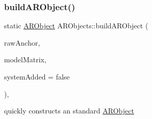 \subsubsection{\texorpdfstring{build\+A\+R\+Object()}{buildARObject()}}
{\footnotesize\ttfamily static \mbox{\hyperlink{struct_a_r_objects_1_1_a_r_object}{A\+R\+Object}} A\+R\+Objects\+::build\+A\+R\+Object (\begin{DoxyParamCaption}\item[{A\+R\+Anchor $\ast$}]{raw\+Anchor,  }\item[{of\+Matrix4x4}]{model\+Matrix,  }\item[{bool}]{system\+Added = {\ttfamily false} }\end{DoxyParamCaption})\hspace{0.3cm}{\ttfamily [inline]}, {\ttfamily [static]}}



quickly constructs an standard \mbox{\hyperlink{struct_a_r_objects_1_1_a_r_object}{A\+R\+Object}} 

